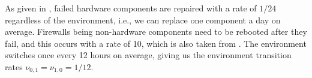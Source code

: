 \documentclass[12pt]{article}
\begin{document}
As given in \cite{Godd:2001}, failed hardware components are repaired with a
rate of $1 / 24$ regardless of the environment, i.e., we can replace one component
a day on average. Firewalls being non-hardware components need to be rebooted
after they fail, and this occurs with a rate of 10, which is also taken from
\cite{Godd:2001}. The environment switches once every 12 hours on average,
giving us the environment transition rates $\nu_{0, 1} = \nu_{1, 0} = 1 / 12$.



\end{document}
